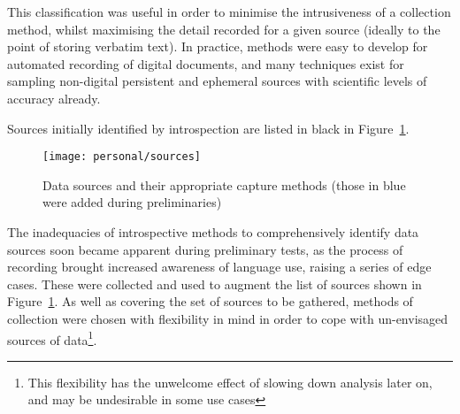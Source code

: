 This classification was useful in order to minimise the intrusiveness of a collection method, whilst maximising the detail recorded for a given source (ideally to the point of storing verbatim text).  In practice, methods were easy to develop for automated recording of digital documents, and many techniques exist for sampling non-digital persistent and ephemeral sources with scientific levels of accuracy already.

Sources initially identified by introspection are listed in black in Figure~\ref{fig:personal:datasources}.

\begin{figure}[p]
\centering
\texttt{[image: personal/sources]}
\caption{Data sources and their appropriate capture methods (those in blue were added during preliminaries)}
\label{fig:personal:datasources}
\end{figure}



The inadequacies of introspective methods to comprehensively identify data sources soon became apparent during preliminary tests, as the process of recording brought increased awareness of language use, raising a series of edge cases.  These were collected and used to augment the list of sources shown in Figure~\ref{fig:personal:datasources}.  As well as covering the set of sources to be gathered, methods of collection were chosen with flexibility in mind in order to cope with un-envisaged sources of data\footnote{This flexibility has the unwelcome effect of slowing down analysis later on, and may be undesirable in some use cases}.



